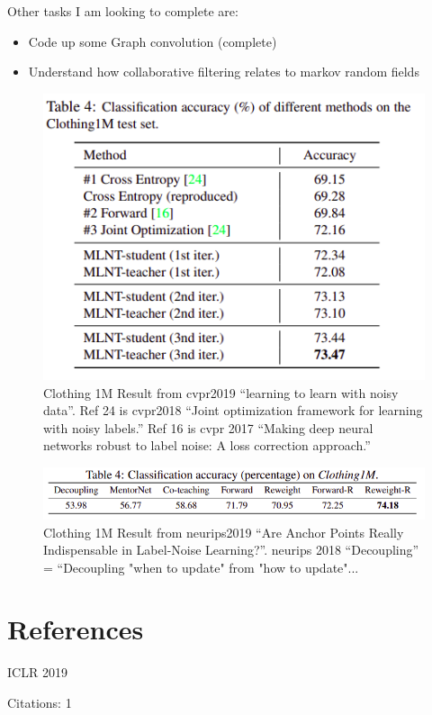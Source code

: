 \documentclass[11pt]{article}
\begin{document}
\vspace{2cm}
\noindent Other tasks I am looking to complete are:
\begin{itemize}
\item Code up some Graph convolution (complete)
\item Understand how collaborative filtering relates to markov random fields
\end{itemize}

\begin{figure}[h]
  \centering
  \includegraphics[width=0.5\linewidth]{cvpr2019_learning_to_learn_w_noisy_data}
  \caption{Clothing 1M Result from cvpr2019 ``learning to learn with noisy data''. Ref 24 is cvpr2018 ``Joint optimization framework for learning with noisy labels.'' Ref 16 is cvpr 2017 ``Making deep neural networks robust to label noise: A loss correction approach.''}
\end{figure}

\begin{figure}[h]
  \centering
  \includegraphics[width=0.8\linewidth]{neurips2019_anchor_points}
  \caption{Clothing 1M Result from neurips2019 ``Are Anchor Points Really Indispensable in Label-Noise Learning?''. neurips 2018 ``Decoupling'' = ``Decoupling "when to update" from "how to update"... }
\end{figure}


\clearpage
\newpage
\section{References}




\noindent ICLR 2019

\noindent Citations: 1
\end{document}
